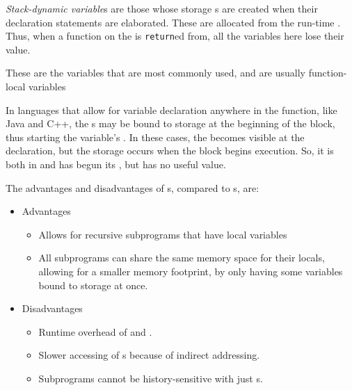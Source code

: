 \begin{definition}\label{def:Stack-Dynamic_Variable_Binding_Lifetime}
  \emph{Stack-dynamic variable}s are those whose storage s are created when their declaration statements are elaborated.
  These are allocated from the run-time .
  Thus, when a function on the  is \texttt{return}ed from, all the variables here lose their value.

  \begin{remark}
    These are the variables that are most commonly used, and are usually function-local variables
  \end{remark}

  \begin{remark}
    In languages that allow for variable declaration anywhere in the function, like Java and C++, the s may be bound to storage at the beginning of the block, thus starting the variable's .
    In these cases, the  becomes visible at the declaration, but the storage  occurs when the block begins execution.
    So, it is both in  and has begun its , but has no useful value.
  \end{remark}

  The advantages and disadvantages of s, compared to s, are:
  \begin{itemize}[noitemsep]
  \item Advantages
    \begin{itemize}[noitemsep]
    \item Allows for recursive subprograms that have local variables
    \item All subprograms can share the same memory space for their locals, allowing for a smaller memory footprint, by only having some variables bound to storage at once.
    \end{itemize}
  \item Disadvantages
    \begin{itemize}[noitemsep]
    \item Runtime overhead of  and .
    \item Slower accessing of s because of indirect addressing.
    \item Subprograms cannot be history-sensitive with just s.
    \end{itemize}
  \end{itemize}
\end{definition}

